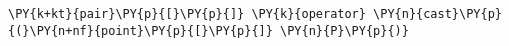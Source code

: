 \begin{Verbatim}[commandchars=\\\{\}]
    \PY{k+kt}{pair}\PY{p}{[}\PY{p}{]} \PY{k}{operator} \PY{n}{cast}\PY{p}{(}\PY{n+nf}{point}\PY{p}{[}\PY{p}{]} \PY{n}{P}\PY{p}{)}
\end{Verbatim}
